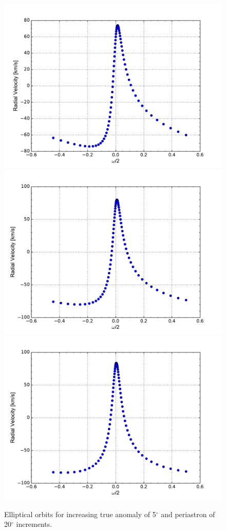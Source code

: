 \documentclass[onecolumn]{aastex6}
\begin{document}
\begin{figure}[ht]
  \includegraphics[scale=0.3]{p.pdf}%
  \includegraphics[scale=0.3]{q.pdf}%
  \includegraphics[scale=0.3]{r.pdf}%



  \caption{Elliptical orbits for increasing true anomaly of 5$^\circ$ and periastron of 20$^\circ$ increments.}
  \label{distancevel}
\end{figure}
\end{document}
